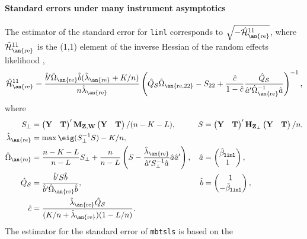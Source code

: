 \documentclass{mynotes}
\newcommand{\by}{\mathbf{Y}} %
\newcommand{\bt}{\mathbf{T}} %
\newcommand{\bz}{\mathbf{Z}} %
\newcommand{\bw}{\mathbf{W}} %
\newcommand{\Hm}[1]{\mathbf{H}_{#1}} %
\newcommand{\Mm}[1]{\mathbf{M}_{#1}} %
\newcommand{\hQs}{\hat{Q}_{\mathcal{S}}} %
\newcommand{\h}[2]{\hat{#1}_{\text{\an{#2}}}} %
\begin{document}
\paragraph{Standard errors under many instrument asymptotics}
The estimator of the standard error for \texttt{liml} corresponds to
$\sqrt{-\h{\mathcal{H}}{re}^{11}}$, where $\h{\mathcal{H}}{re}^{11}$ is the
(1,1) element of the inverse Hessian of the random effects likelihood
\citep{kolesar12re},
    \begin{equation*}
      \h{\mathcal{H}}{re}^{11}= \frac{\hat{b}'\h{\Omega}{re}\hat{b}
        (\h{\lambda}{re}+K/n)}{n\h{\lambda}{re}}\left(
        \hQs\h{\Omega}{re,22}-S_{22}+\frac{\hat c}{1-\hat c}\frac{\hQs}{\hat{a}'
\h{\Omega}{re}^{-1}\hat{a}} \right)^{-1},
    \end{equation*}
where
    \begin{align}
      S_{\perp}&=      \begin{pmatrix}
        \by&\bt
      \end{pmatrix}'
\Mm{\bz,\bw}
      \begin{pmatrix}
        \by&\bt
      \end{pmatrix}
/(n-K-L),&S&= \begin{pmatrix}
        \by&\bt
      \end{pmatrix}'
\Hm{\bz_{\perp}}
      \begin{pmatrix}
        \by&\bt
      \end{pmatrix}/n,\label{eq:sperp-s}\\
      \h{\lambda}{re}&=\max\eig(S^{-1}_{\perp}S)-K /n,\\
      \h{\Omega}{re}&=\frac{n-K-L}{n-L}S_{\perp}+\frac{n}{n-L}\left(S-
        \frac{\h{\lambda}{re}}{\hat{a}'S_{\perp}^{-1}\hat{a} } \hat{a}\hat{a}'\right),&
      \hat{a}&=
      \begin{pmatrix}
        \hat{\beta}_{\mathtt{liml}}\\1
      \end{pmatrix},
      \\
      \hQs &=\frac{\hat{b}'S \hat{b}}{\hat{b}'\h{\Omega}{re} \hat{b}},& \hat{b}
      &=
  \begin{pmatrix}
    1\\-\hat{\beta}_{\mathtt{liml}}
  \end{pmatrix},\\
\hat c&=\frac{\h{\lambda}{re} \hQs}{(K/n+\h{\lambda}{re})(1-L/n)}.
    \end{align}
    The estimator for the standard error of \texttt{mbtsls} is based on the
\end{document}
